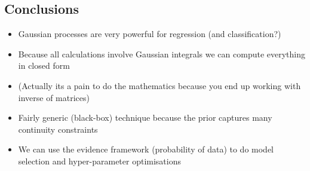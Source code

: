 \begin{slide}
\section{Conclusions}

\begin{PauseHighLight}
  \begin{itemize}
  \item Gaussian processes are very powerful for regression (and
    classification?)\pause
  \item Because all calculations involve Gaussian integrals we can
    compute everything in closed form\pause
  \item (Actually its a pain to do the mathematics because you end up
    working with inverse of matrices)\pause
  \item Fairly generic (black-box) technique because the prior captures
    many continuity constraints\pause
  \item We can use the evidence framework (probability of data) to do model
    selection and hyper-parameter optimisations\pause
  \end{itemize}
\end{PauseHighLight}

\end{slide}

